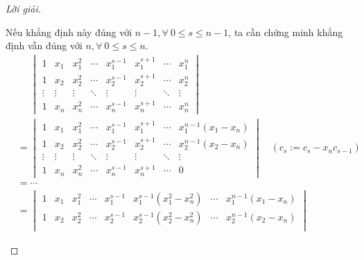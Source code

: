 \begin{proof}[Lời giải]
\begin{enumerate}[label = (\alph*)]
              Nếu khẳng định này đúng với $n - 1, \forall\ 0\le s\le n-1$, ta cần chứng minh khẳng định vẫn đúng với $n, \forall\ 0\le s\le n$.
              \begin{align*}
                   & \phantom{=}\begin{vmatrix}
                                    1      & x_{1}  & x_{1}^{2} & \cdots & x_{1}^{s-1} & x_{1}^{s+1} & \cdots & x_{1}^{n} \\
                                    1      & x_{2}  & x_{2}^{2} & \cdots & x_{2}^{s-1} & x_{2}^{s+1} & \cdots & x_{2}^{n} \\
                                    \vdots & \vdots & \vdots    & \ddots & \vdots      & \vdots      & \ddots & \vdots    \\
                                    1      & x_{n}  & x_{n}^{2} & \cdots & x_{n}^{s-1} & x_{n}^{s+1} & \cdots & x_{n}^{n}
                                \end{vmatrix}                                          \\
                   & =
                  \begin{vmatrix}
                      1      & x_{1}  & x_{1}^{2} & \cdots & x_{1}^{s-1} & x_{1}^{s+1} & \cdots & x_{1}^{n-1}(x_{1} - x_{n}) \\
                      1      & x_{2}  & x_{2}^{2} & \cdots & x_{2}^{s-1} & x_{2}^{s+1} & \cdots & x_{2}^{n-1}(x_{2} - x_{n}) \\
                      \vdots & \vdots & \vdots    & \ddots & \vdots      & \vdots      & \ddots & \vdots                     \\
                      1      & x_{n}  & x_{n}^{2} & \cdots & x_{n}^{s-1} & x_{n}^{s+1} & \cdots & 0
                  \end{vmatrix}\quad(c_{s}:=c_{s} - x_{n}c_{s-1})                                       \\
                   & = \cdots                                                                                                                                  \\
                   & =
                  \begin{vmatrix}
                      1      & x_{1}  & x_{1}^{2} & \cdots & x_{1}^{s-1} & x_{1}^{s-1}(x_{1}^{2} - x_{n}^{2}) & \cdots & x_{1}^{n-1}(x_{1} - x_{n}) \\
                      1      & x_{2}  & x_{2}^{2} & \cdots & x_{2}^{s-1} & x_{2}^{s-1}(x_{2}^{2} - x_{n}^{2}) & \cdots & x_{2}^{n-1}(x_{2} - x_{n}) \\

\end{vmatrix}
\end{align*}
\end{enumerate}
\end{proof}
